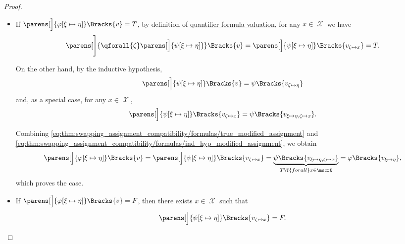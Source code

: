 \begin{proof}
\begin{itemize}
\begin{itemize}
      \begin{itemize}
        \item If \( \parens[\Big]{\varphi[\xi \mapsto \eta]}\Bracks{v} = T \), by definition of \hyperref[def:first_order_valuation/formula_valuation]{quantifier formula valuation}, for any \( x \in \mscrX \) we have
        \begin{equation}\label{eq:thm:swapping_assignment_compatibility/formulas/true_modified_assignment}
          \parens[\Bigg]{\qforall{\zeta} \parens[\Big]{ \psi[\xi \mapsto \eta] }}\Bracks{v}
          =
          \parens[\Big]{\psi[\xi \mapsto \eta]}\Bracks{v_{\zeta \mapsto x}}
          =
          T.
        \end{equation}

        On the other hand, by the inductive hypothesis,
        \begin{equation*}
          \parens[\Big]{ \psi[\xi \mapsto \eta] }\Bracks{v} = \psi\Bracks{v_{\xi \mapsto \eta}}
        \end{equation*}
        and, as a special case, for any \( x \in \mscrX \),
        \begin{equation}\label{eq:thm:swapping_assignment_compatibility/formulas/ind_hyp_modified_assignment}
          \parens[\Big]{ \psi[\xi \mapsto \eta] }\Bracks{v_{\zeta \mapsto x}} = \psi\Bracks{v_{\xi \mapsto \eta, \zeta \mapsto x}}.
        \end{equation}

        Combining \eqref{eq:thm:swapping_assignment_compatibility/formulas/true_modified_assignment} and \eqref{eq:thm:swapping_assignment_compatibility/formulas/ind_hyp_modified_assignment}, we obtain
        \begin{equation*}
          \parens[\Big]{ \varphi[\xi \mapsto \eta] }\Bracks{v}
          =
          \parens[\Big]{ \psi[\xi \mapsto \eta] }\Bracks{v_{\zeta \mapsto x}}
          =
          \underbrace{\psi\Bracks{v_{\xi \mapsto \eta, \zeta \mapsto x}}}_{T \T{for all} x \in \mscrX}
          =
          \varphi\Bracks{v_{\xi \mapsto \eta}},
        \end{equation*}
        which proves the case.

        \item If \( \parens[\Big]{\varphi[\xi \mapsto \eta]}\Bracks{v} = F \), then there exists \( x \in \mscrX \) such that
        \begin{equation*}
          \parens[\Big]{\psi[\xi \mapsto \eta]}\Bracks{v_{\zeta \mapsto x}} = F.
        \end{equation*}


\end{itemize}
\end{itemize}
\end{itemize}
\end{proof}
